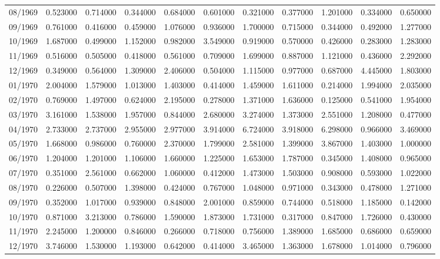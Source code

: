 \begin{tabular}{lrrrrrrrrrr}
08/1969 & 0.523000 & 0.714000 & 0.344000 & 0.684000 & 0.601000 & 0.321000 & 0.377000 & 1.201000 & 0.334000 & 0.650000 \\
09/1969 & 0.761000 & 0.416000 & 0.459000 & 1.076000 & 0.936000 & 1.700000 & 0.715000 & 0.344000 & 0.492000 & 1.277000 \\
10/1969 & 1.687000 & 0.499000 & 1.152000 & 0.982000 & 3.549000 & 0.919000 & 0.570000 & 0.426000 & 0.283000 & 1.283000 \\
11/1969 & 0.516000 & 0.505000 & 0.418000 & 0.561000 & 0.709000 & 1.699000 & 0.887000 & 1.121000 & 0.436000 & 2.292000 \\
12/1969 & 0.349000 & 0.564000 & 1.309000 & 2.406000 & 0.504000 & 1.115000 & 0.977000 & 0.687000 & 4.445000 & 1.803000 \\
01/1970 & 2.004000 & 1.579000 & 1.013000 & 1.403000 & 0.414000 & 1.459000 & 1.611000 & 0.214000 & 1.994000 & 2.035000 \\
02/1970 & 0.769000 & 1.497000 & 0.624000 & 2.195000 & 0.278000 & 1.371000 & 1.636000 & 0.125000 & 0.541000 & 1.954000 \\
03/1970 & 3.161000 & 1.538000 & 1.957000 & 0.844000 & 2.680000 & 3.274000 & 1.373000 & 2.551000 & 1.208000 & 0.477000 \\
04/1970 & 2.733000 & 2.737000 & 2.955000 & 2.977000 & 3.914000 & 6.724000 & 3.918000 & 6.298000 & 0.966000 & 3.469000 \\
05/1970 & 1.668000 & 0.986000 & 0.760000 & 2.370000 & 1.799000 & 2.581000 & 1.399000 & 3.867000 & 1.403000 & 1.000000 \\
06/1970 & 1.204000 & 1.201000 & 1.106000 & 1.660000 & 1.225000 & 1.653000 & 1.787000 & 0.345000 & 1.408000 & 0.965000 \\
07/1970 & 0.351000 & 2.561000 & 0.662000 & 1.060000 & 0.412000 & 1.473000 & 1.503000 & 0.908000 & 0.593000 & 1.022000 \\
08/1970 & 0.226000 & 0.507000 & 1.398000 & 0.424000 & 0.767000 & 1.048000 & 0.971000 & 0.343000 & 0.478000 & 1.271000 \\
09/1970 & 0.352000 & 1.017000 & 0.939000 & 0.848000 & 2.001000 & 0.859000 & 0.744000 & 0.518000 & 1.185000 & 0.142000 \\
10/1970 & 0.871000 & 3.213000 & 0.786000 & 1.590000 & 1.873000 & 1.731000 & 0.317000 & 0.847000 & 1.726000 & 0.430000 \\
11/1970 & 2.245000 & 1.200000 & 0.846000 & 0.266000 & 0.718000 & 0.756000 & 1.389000 & 1.685000 & 0.686000 & 0.659000 \\
12/1970 & 3.746000 & 1.530000 & 1.193000 & 0.642000 & 0.414000 & 3.465000 & 1.363000 & 1.678000 & 1.014000 & 0.796000 \\

\end{tabular}
